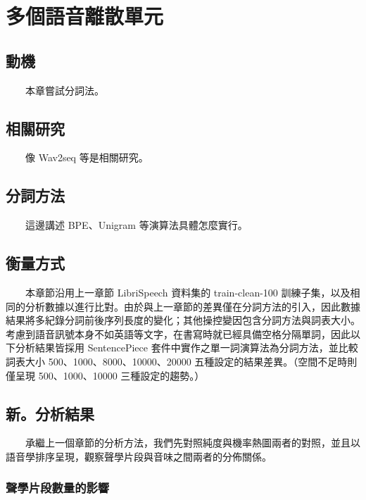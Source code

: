 
\chapter{多個語音離散單元}   

    {   
{     
\section{動機}            　　本章嘗試分詞法。
\section{相關研究} 　　像 Wav2seq \cite{wu_wav2seq_2023}  等是相關研究。
\section{分詞方法} 　　這邊講述 BPE、Unigram 等演算法具體怎麼實行。}
\section{衡量方式}
　　本章節沿用上一章節 LibriSpeech 資料集的 train-clean-100 訓練子集，以及相同的分析數據以進行比對。由於與上一章節的差異僅在分詞方法的引入，因此數據結果將多紀錄分詞前後序列長度的變化；其他操控變因包含分詞方法與詞表大小。考慮到語音訊號本身不如英語等文字，在書寫時就已經具備空格分隔單詞，因此以下分析結果皆採用 SentencePiece 套件中實作之單一詞演算法為分詞方法，並比較詞表大小 500、1000、8000、10000、20000 五種設定的結果差異。（空間不足時則僅呈現 500、1000、10000 三種設定的趨勢。）  }  %

\section{新。分析結果} 
　　承繼上一個章節的分析方法，我們先對照純度與機率熱圖兩者的對照，並且以語音學排序呈現，觀察聲學片段與音味之間兩者的分佈關係。
\subsection{聲學片段數量的影響}

